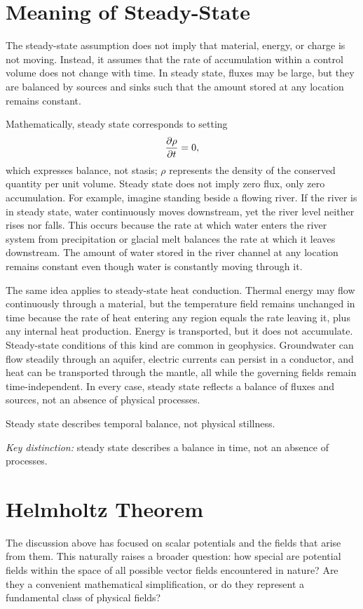\section{Meaning of Steady-State}

The steady-state assumption does not imply that material, energy, or charge is not moving. Instead, it assumes that the rate of accumulation within a control volume does not change with time. In steady state, fluxes may be large, but they are balanced by sources and sinks such that the amount stored at any location remains constant.

Mathematically, steady state corresponds to setting
\[
\pdv{\rho}{t} = 0,
\]
which expresses balance, not stasis; $\rho$ represents the density of the conserved quantity per unit volume. Steady state does not imply zero flux, only zero accumulation. For example, imagine standing beside a flowing river. If the river is in steady state, water continuously moves downstream, yet the river level neither rises nor falls. This occurs because the rate at which water enters the river system from precipitation or glacial melt balances the rate at which it leaves downstream. The amount of water stored in the river channel at any location remains constant even though water is constantly moving through it.

The same idea applies to steady-state heat conduction. Thermal energy may flow continuously through a material, but the temperature field remains unchanged in time because the rate of heat entering any region equals the rate leaving it, plus any internal heat production. Energy is transported, but it does not accumulate.  Steady-state conditions of this kind are common in geophysics. Groundwater can flow steadily through an aquifer, electric currents can persist in a conductor, and heat can be transported through the mantle, all while the governing fields remain time-independent. In every case, steady state reflects a balance of fluxes and sources, not an absence of physical processes.

Steady state describes temporal balance, not physical stillness.

\textit{Key distinction:} steady state describes a balance in time, not an absence of
processes.


\section{Helmholtz Theorem}

The discussion above has focused on scalar potentials and the fields that arise from them. This naturally raises a broader question: how special are potential fields within the space of all possible vector fields encountered in nature? Are they a convenient mathematical simplification, or do they represent a fundamental class of physical fields?

